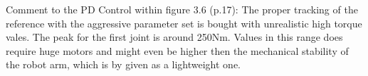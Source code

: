 Comment to the PD Control within figure 3.6 (p.17):
The proper tracking of the reference with the aggressive parameter set is bought with unrealistic high torque vales. The peak for the first joint is around 250Nm. Values in this range does require huge motors and might even be higher then the mechanical stability of the robot arm, which is by given as a lightweight one.

